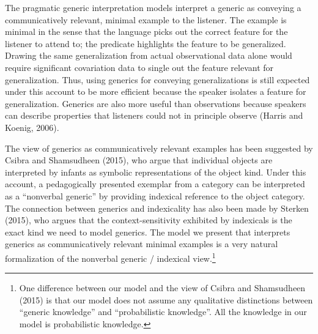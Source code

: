 \documentclass[floatsintext,doc]{apa6}
\let\rmarkdownfootnote\footnote%
\def\footnote{\protect\rmarkdownfootnote}
\begin{document}
The pragmatic generic interpretation models interpret a generic as conveying a communicatively relevant, minimal example to the listener. 
The example is minimal in the sense that the language picks out the correct feature for the listener to attend to; the predicate highlights the feature to be generalized. 
Drawing the same generalization from actual observational data alone would require significant covariation data to single out the feature relevant for generalization. 
Thus, using generics for conveying generalizations is still expected under this account to be more efficient because the speaker isolates a feature for generalization. 
Generics are also more useful than observations because speakers can describe properties that listeners could not in principle observe (Harris and Koenig, 2006). 

The view of generics as communicatively relevant examples has been suggested by Csibra and Shamsudheen (2015), who argue that individual objects are interpreted by infants as symbolic representations of the object kind.
Under this account, a pedagogically presented exemplar from a category can be interpreted as a \enquote{nonverbal generic} by providing indexical reference to the object category.
The connection between generics and indexicality has also been made by Sterken (2015), who argues that the context-sensitivity exhibited by indexicals is the exact kind we need to model generics.
The model we present that interprets generics as communicatively relevant minimal examples is a very natural formalization of the nonverbal generic / indexical view.\footnote{
	One difference between our model and the view of Csibra and Shamsudheen (2015) is that our model does not assume any qualitative distinctions between ``generic knowledge'' and ``probabilistic knowledge''. All the knowledge in our model is probabilistic knowledge. 
	}
\end{document}
